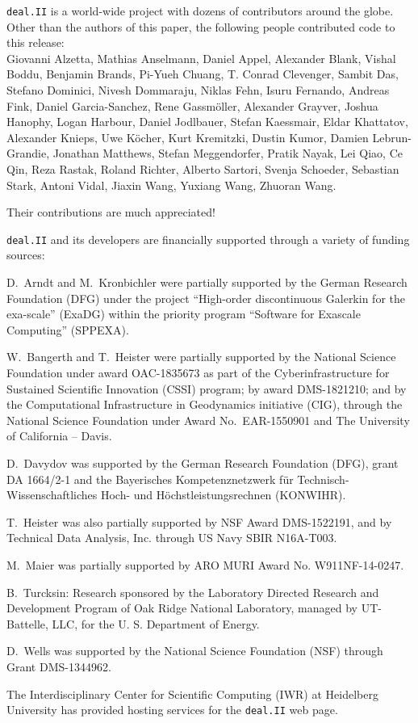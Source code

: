\documentclass{ansarticle-preprint}
\newcommand{\specialword}[1]{\texttt{#1}}
\newcommand{\dealii}{{\specialword{deal.II}}\xspace}
\begin{document}
\dealii is a world-wide project with dozens of contributors around the
globe. Other than the authors of this paper, the following people
contributed code to this release:\\
  Giovanni Alzetta,
  Mathias Anselmann,
  Daniel Appel,
  Alexander Blank,
  Vishal Boddu,
  Benjamin Brands,
  Pi-Yueh Chuang,
  T. Conrad Clevenger,
  Sambit Das,
  Stefano Dominici,
  Nivesh Dommaraju,
  Niklas Fehn,
  Isuru Fernando,
  Andreas Fink,
  Daniel Garcia-Sanchez,
  Rene Gassm{\"o}ller,
  Alexander Grayver,
  Joshua Hanophy,
  Logan Harbour,
  Daniel Jodlbauer,
  Stefan Kaessmair,
  Eldar Khattatov,
  Alexander Knieps,
  Uwe K{\"o}cher,
  Kurt Kremitzki,
  Dustin Kumor,
  Damien Lebrun-Grandie,
  Jonathan Matthews,
  Stefan Meggendorfer,
  Pratik Nayak,
  Lei Qiao,
  Ce Qin,
  Reza Rastak,
  Roland Richter,
  Alberto Sartori,
  Svenja Schoeder,
  Sebastian Stark,
  Antoni Vidal,
  Jiaxin Wang,
  Yuxiang Wang,
  Zhuoran Wang.

Their contributions are much appreciated!


\bigskip

\dealii and its developers are financially supported through a
variety of funding sources:

D.~Arndt and M.~Kronbichler were partially supported by the German
Research Foundation (DFG) under the project ``High-order discontinuous
Galerkin for the exa-scale'' (\mbox{ExaDG}) within the priority program ``Software
for Exascale Computing'' (SPPEXA).

W.~Bangerth and T.~Heister were partially
supported by the National Science Foundation under award OAC-1835673
as part of the Cyberinfrastructure for Sustained Scientific Innovation (CSSI)
program; by award DMS-1821210; and by the Computational Infrastructure
in Geodynamics initiative (CIG), through the National Science
Foundation under Award No.~EAR-1550901 and The
University of California -- Davis.

D.~Davydov was supported by the German Research Foundation (DFG), grant DA
1664/2-1 and the Bayerisches Kompetenznetzwerk
f\"ur Technisch-Wissenschaftliches Hoch- und H\"ochstleistungsrechnen
(KONWIHR).

T.~Heister was also partially supported by NSF Award DMS-1522191, and
by Technical Data Analysis, Inc. through US Navy SBIR N16A-T003.

M.~Maier was partially supported by ARO MURI Award No. W911NF-14-0247.

B.~Turcksin: Research sponsored by the Laboratory Directed Research and
Development Program of Oak Ridge National Laboratory, managed by UT-Battelle,
LLC, for the U. S. Department of Energy.

D.~Wells was supported by the National Science Foundation (NSF) through Grant
DMS-1344962.

The Interdisciplinary Center for Scientific Computing (IWR) at Heidelberg
University has provided hosting services for the \dealii web page.


{}

\end{document}
